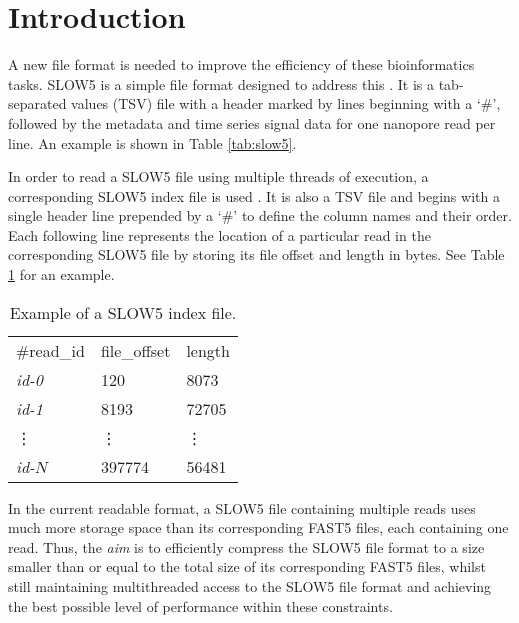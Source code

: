\section{Introduction}
\label{sec:intro}

A new file format is needed to improve the efficiency of these bioinformatics tasks. SLOW5 is a simple file format designed to address this \cite{slow5}. It is a tab-separated values (TSV) file with a header marked by lines beginning with a `\#', followed by the metadata and time series signal data for one nanopore read per line. An example is shown in Table \ref{tab:slow5}.

In order to read a SLOW5 file using multiple threads of execution, a corresponding SLOW5 index file is used \cite{slow5}. It is also a TSV file and begins with a single header line prepended by a `\#' to define the column names and their order. Each following line represents the location of a particular read in the corresponding SLOW5 file by storing its file offset and length in bytes. See Table \ref{tab:slow5idx} for an example.

\begin{table}[h!]
    \caption{Example of a SLOW5 index file.\label{tab:slow5idx}}
    \begin{tabular}{|*{3}{l}|}
        \hline
        \#read\_id & file\_offset & length \\
        \textit{id-0} & 120 & 8073 \\
        \textit{id-1} & 8193 & 72705 \\
        \; \vdots & \; \vdots & \;\; \vdots \\
        \textit{id-$N$} & 397774 & 56481 \\
        \hline
    \end{tabular}
\end{table}

In the current readable format, a SLOW5 file containing multiple reads uses much more storage space than its corresponding FAST5 files, each containing one read. Thus, the \textit{aim} is to efficiently compress the SLOW5 file format to a size smaller than or equal to the total size of its corresponding FAST5 files, whilst still maintaining multithreaded access to the SLOW5 file format and achieving the best possible level of performance within these constraints.

